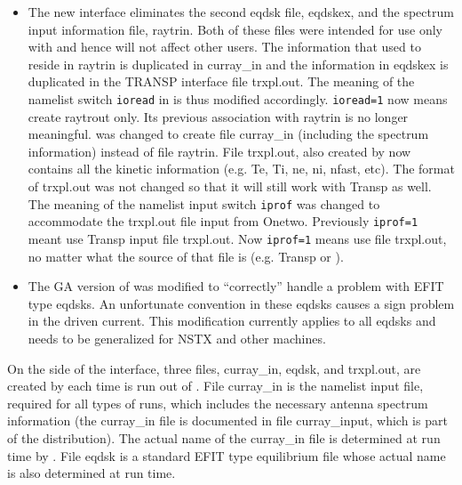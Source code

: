 \begin {itemize}
 thirds of the stored energy density divided by the fast ion density. This
 feature is available only by creating the \ct input files using the \ot code.
 An option in \ot will collapse all the fast ion components into one effective
 component thereby recovering the more usual mode of operation of \ct.
 \item The new \ot interface eliminates the second eqdsk file,
 eqdskex, and the spectrum input information file, raytrin.
 Both of these files were intended for use only with \ot and hence
 will not affect other users. The information that used to reside in
 raytrin is duplicated in curray\_in 
 and the information in eqdskex is duplicated in the TRANSP
 interface file trxpl.out. The meaning of the namelist switch \texttt{ioread}
 in \ct  is thus modified accordingly. \texttt{ioread=1} now means create
 raytrout only. Its previous association with raytrin is no longer
 meaningful. \ot  was changed to
 create file curray\_in (including the spectrum information) instead of
 file raytrin. File trxpl.out, also created by \ot now contains all the
 kinetic information (e.g. Te, Ti, ne, ni, nfast, etc). The format of
 trxpl.out was not  changed so that it will still work with Transp as
 well. The meaning of the \ct namelist input switch \texttt{iprof} was
 changed to accommodate the trxpl.out file input from Onetwo.
 Previously \texttt{iprof=1} meant use Transp input file trxpl.out. Now \texttt{iprof=1}
 means use file trxpl.out, no matter what the source of that file is
 (e.g. Transp or \ot).
 \item The GA version of \ct was modified to ``correctly'' handle a
  problem with EFIT type eqdsks. An unfortunate convention in these
  eqdsks causes a sign problem in the driven current. This modification
  currently applies to all eqdsks and needs to be generalized for
  NSTX and other machines.
\end{itemize}

 On the \ot side of the interface, three files, curray\_in, eqdsk, and
 trxpl.out, are created by \ot each time \ct is run out of \ot. 
   File curray\_in is the namelist input
 file, required for all types of \ct runs,
 which includes the necessary antenna spectrum information (the
 curray\_in file is documented in file curray\_input, which is part of
 the \ct distribution). The actual
 name of the curray\_in file is determined at run time by \ot. 
 File eqdsk is a standard
 EFIT type equilibrium file whose actual name is also determined  at run
 time.

